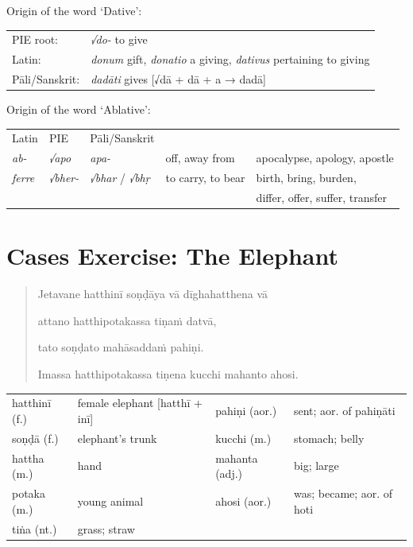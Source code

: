 \documentclass[11pt,oneside]{memoir}
\begin{document}
Origin of the word `Dative':

\begin{center}
\begin{tabular}{ll}
PIE root: & \emph{√do-} to give\\[0pt]
Latin: & \emph{donum} gift, \emph{donatio} a giving, \emph{dativus} pertaining to giving\\[0pt]
Pāli/Sanskrit: & \emph{dadāti} gives [√dā + dā + a → dadā]\\[0pt]
\end{tabular}
\end{center}

Origin of the word `Ablative':

\begin{center}
\begin{tabular}{lllll}
Latin & PIE & Pāli/Sanskrit &  & \\[0pt]
\emph{ab-} & \emph{√apo} & \emph{apa-} & off, away from & apocalypse, apology, apostle\\[0pt]
\emph{ferre} & \emph{√bher-} & \emph{√bhar} / \emph{√bhṛ} & to carry, to bear & birth, bring, burden,\\[0pt]
 &  &  &  & differ, offer, suffer, transfer\\[0pt]
\end{tabular}
\end{center}

\clearpage

\section{Cases Exercise: The Elephant}
\label{sec:org68ecf98}

\casesLegendHeaderBGHere

\begin{quote}
Jetavane hatthinī soṇḍāya vā dīghahatthena vā

attano hatthipotakassa tiṇaṁ datvā,

tato soṇḍato mahāsaddaṁ pahiṇi.

Imassa hatthipotakassa tiṇena kucchi mahanto ahosi.
\end{quote}

\bigskip

\begin{center}
\begin{tabular}{llll}
hatthinī (f.) & female elephant [hatthī + inī] & pahiṇi (aor.) & sent; aor. of pahiṇāti\\[0pt]
soṇḍā (f.) & elephant's trunk & kucchi (m.) & stomach; belly\\[0pt]
hattha (m.) & hand & mahanta (adj.) & big; large\\[0pt]
potaka (m.) & young animal & ahosi (aor.) & was; became; aor. of hoti\\[0pt]
tiṅa (nt.) & grass; straw &  & \\[0pt]
\end{tabular}
\end{center}
\end{document}
